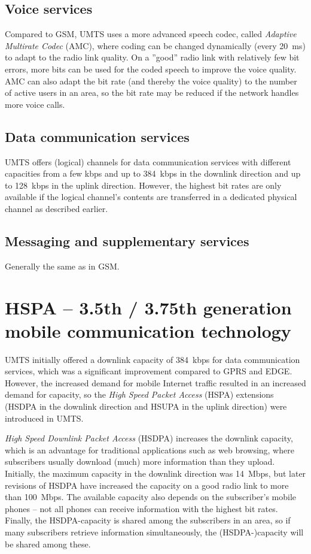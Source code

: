 \subsection{Voice services}
Compared to GSM, UMTS uses a more advanced speech codec, called \emph{Adaptive Multirate Codec} (AMC), where coding can be changed dynamically (every 20~ms) to adapt to the radio link quality. On a ''good'' radio link with relatively few bit errors, more bits can be used for the coded speech to improve the voice quality. AMC can also adapt the bit rate (and thereby the voice quality) to the number of active users in an area, so the bit rate may be reduced if the network handles more voice calls.


\subsection{Data communication services}
UMTS offers (logical) channels for data communication services with different capacities from a few kbps and up to 384~kbps in the downlink direction and up to 128~kbps in the uplink direction. However, the highest bit rates are only available if the logical channel's contents are transferred in a dedicated physical channel as described earlier.

\subsection{Messaging and supplementary services}
Generally the same as in GSM.

\section{HSPA -- 3.5th / 3.75th generation mobile communication technology}
UMTS initially offered a downlink capacity of 384~kbps for data communication services, which was a significant improvement compared to GPRS and EDGE. However, the increased demand for mobile Internet traffic resulted in an increased demand for capacity, so the \emph{High Speed Packet Access} (HSPA) extensions (HSDPA in the downlink direction and HSUPA in the uplink direction) were introduced in UMTS.

\emph{High Speed Downlink Packet Access} (HSDPA) increases the downlink capacity, which is an advantage for traditional applications such as web browsing, where subscribers usually download (much) more information than they upload. Initially, the maximum capacity in the downlink direction was 14~Mbps, but later revisions of HSDPA have increased the capacity on a good radio link to more than 100~Mbps. The available capacity also depends on the subscriber's mobile phones -- not all phones can receive information with the highest bit rates. Finally, the HSDPA-capacity is shared among the subscribers in an area, so if many subscribers retrieve information simultaneously, the (HSDPA-)capacity will be shared among these.

